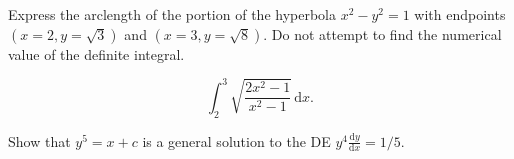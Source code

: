 \documentclass[12pt,fleqn,answers]{exam}
\begin{document}
\begin{questions}
\begin{parts}
\begin{solution}[2.5in] 

\end{solution}
\end{parts}

\question[5] Express the arclength of the portion of the hyperbola $x^2 - y^2 = 1$ with endpoints $(x=2, y=\sqrt{3})$ and $(x=3, y = \sqrt{8})$. Do not
attempt to find the numerical value of the definite integral.
\begin{solution}
\[\int_{2}^{3}{\left. \sqrt{\frac{2 {{x}^{2}}-1}{{{x}^{2}}-1}} \, \mathrm{d} x\right.}.\]
\end{solution}


\question [5] Show that $y^5=x+ c$ is a general solution to the DE $y^4  \frac{\mathrm{d} y}{\mathrm{d} x}  = 1/5$.
\end{questions}
%     
\end{document}
